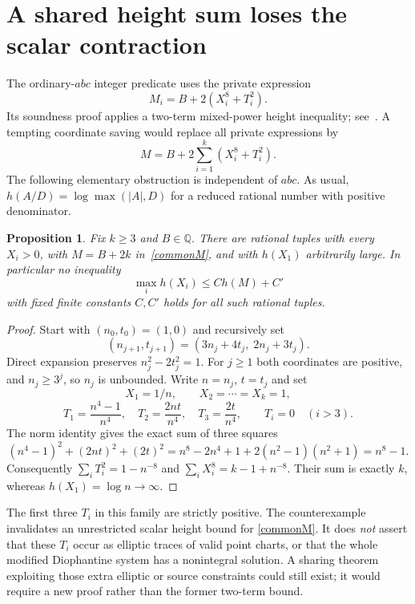 \documentclass[11pt]{article}
\newtheorem{proposition}[theorem]{Proposition}
\newcommand{\Q}{\mathbb Q}\newcommand{\Z}{\mathbb Z}
\begin{document}
\section{A shared height sum loses the scalar contraction}

The ordinary-$abc$ integer predicate uses the private expression
\[
                    M_i=B+2(X_i^8+T_i^2).
\]
Its soundness proof applies a two-term mixed-power height inequality;
see~\cite{abc56,signed}. A tempting coordinate saving would replace all
private expressions by
\begin{equation}\label{commonM}
                    M=B+2\sum_{i=1}^k(X_i^8+T_i^2).
\end{equation}
The following elementary obstruction is independent of $abc$.
As usual, $h(A/D)=\log\max(|A|,D)$ for a reduced rational number
with positive denominator.

\begin{proposition}\label{height}
Fix $k\ge3$ and $B\in\Q$. There are rational tuples with every
$X_i>0$, with $M=B+2k$ in~\eqref{commonM}, and with
$h(X_1)$ arbitrarily large. In particular no inequality
\[
                  \max_i h(X_i)\le C h(M)+C'
\]
with fixed finite constants $C,C'$ holds for all such rational tuples.
\end{proposition}
\begin{proof}
Start with $(n_0,t_0)=(1,0)$ and recursively set
\[
 (n_{j+1},t_{j+1})=(3n_j+4t_j,\;2n_j+3t_j).
\]
Direct expansion preserves $n_j^2-2t_j^2=1$. For $j\ge1$ both
coordinates are positive, and $n_j\ge3^j$, so $n_j$ is unbounded.
Write $n=n_j$, $t=t_j$ and set
\[
 X_1=1/n,\qquad X_2=\cdots=X_k=1,
\]
\[
 T_1=\frac{n^4-1}{n^4},\quad
 T_2=\frac{2nt}{n^4},\quad
 T_3=\frac{2t}{n^4},\qquad T_i=0\quad(i>3).
\]
The norm identity gives the exact sum of three squares
\[
 (n^4-1)^2+(2nt)^2+(2t)^2
 =n^8-2n^4+1+2(n^2-1)(n^2+1)=n^8-1.
\]
Consequently $\sum_iT_i^2=1-n^{-8}$ and
$\sum_iX_i^8=k-1+n^{-8}$. Their sum is exactly $k$, whereas
$h(X_1)=\log n\longrightarrow\infty$.
\end{proof}

The first three $T_i$ in this family are strictly positive. The
counterexample invalidates an unrestricted scalar height bound for
\eqref{commonM}. It does \emph{not} assert that these $T_i$ occur as
elliptic traces of valid point charts, or that the whole modified
Diophantine system has a nonintegral solution. A sharing theorem
exploiting those extra elliptic or source constraints could still exist;
it would require a new proof rather than the former two-term bound.
\end{document}
